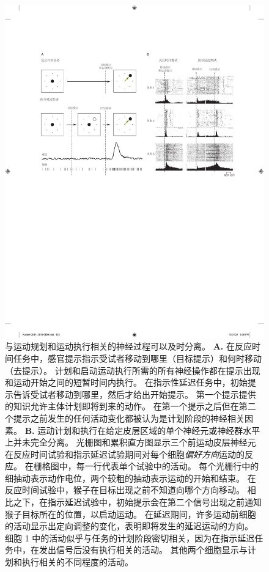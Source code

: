 \begin{figure}[!htb]
	\centering
	\includegraphics[width=1.0\linewidth]{chap34/fig_34_4}
	\caption*{与运动规划和运动执行相关的神经过程可以及时分离\cite{crammond2000prior}。
	\textbf{A.} 在反应时间任务中，感官提示指示受试者移动到哪里（目标提示）和何时移动（去提示）。
	计划和启动运动执行所需的所有神经操作都在提示出现和运动开始之间的短暂时间内执行。
	在指示性延迟任务中，初始提示告诉受试者移动到哪里，然后才给出开始提示。
	第一个提示提供的知识允许主体计划即将到来的动作。
	在第一个提示之后但在第二个提示之前发生的任何活动变化都被认为是计划阶段的神经相关因素。
	\textbf{B.} 运动计划和执行在给定皮层区域的单个神经元或神经群水平上并未完全分离。
	光栅图和累积直方图显示三个前运动皮层神经元在反应时间试验和指示延迟试验期间对每个细胞\textit{偏好方向}运动的反应。
	在栅格图中，每一行代表单个试验中的活动。
	每个光栅行中的细抽动表示动作电位，两个较粗的抽动表示运动的开始和结束。
	在反应时间试验中，猴子在目标出现之前不知道向哪个方向移动。
	相比之下，在指示延迟试验中，初始提示会在第二个信号出现之前通知猴子目标所在的位置，以启动运动。
	在延迟期间，许多运动前细胞的活动显示出定向调整的变化，表明即将发生的延迟运动的方向。
	细胞 1 中的活动似乎与任务的计划阶段密切相关，因为在指示延迟任务中，在发出信号后没有执行相关的活动。
	其他两个细胞显示与计划和执行相关的不同程度的活动。}
\end{figure}




